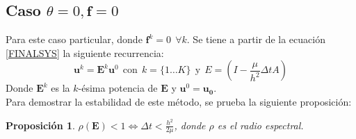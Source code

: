 \documentclass{endm}
\newtheorem{prop_es}{Proposición}
\begin{document}
\subsection{\texorpdfstring{Caso $\theta=0, \boldsymbol{f}=0$}{Theta 0 f 0}} \label{casolindo}

Para este caso particular, donde $\boldsymbol{f}^k = 0 \ \ \forall k$.
Se tiene a partir de la ecuación \ref{FINALSYS} la siguiente recurrencia:
\begin{equation} \label{theta00}
     \boldsymbol{u}^k = \boldsymbol{E}^k\boldsymbol{u}^0 \ \ \text{con} \ \ k=\{1\dots K\} \ \ \text{y} \ \ E =(I-\frac{\mu}{h^2}\Delta tA)
\end{equation}
Donde $\boldsymbol{E}^k$ es la $k$-ésima potencia de $\boldsymbol{E}$ y $\boldsymbol{u}^0=\boldsymbol{u_0}$.\\

Para demostrar la estabilidad de este método, se prueba la siguiente proposición:
\begin{prop_es} \label{dem6}
    $\rho(\boldsymbol{E}) < 1 \iff \Delta t < \frac{h^2}{2\mu}$, donde $\rho$ es el radio espectral.
\end{prop_es}
\end{document}
